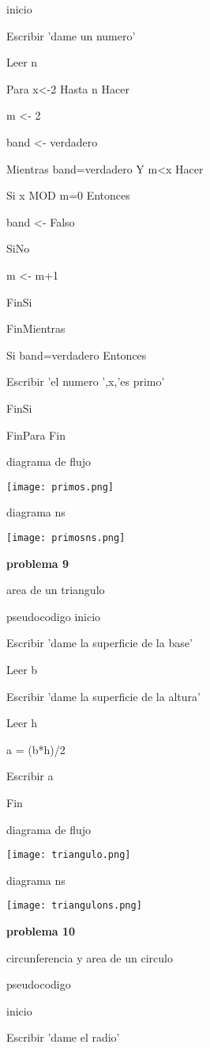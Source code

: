\documentclass[10pt,a4paper]{article}
\begin{document}
\begin{multicols}{2}
inicio

Escribir 'dame un numero'

	Leer n

	Para x<-2 Hasta n Hacer

		m <- 2

		band <- verdadero

		Mientras band=verdadero Y m<x Hacer

			Si x MOD m=0 Entonces

				band <- Falso

			SiNo

				m <- m+1

			FinSi

		FinMientras

		Si band=verdadero Entonces

			Escribir 'el numero ',x,'es primo'

		FinSi
	
	FinPara
Fin
 
 diagrama de flujo
 
\texttt{[image: primos.png]} 

diagrama ns

\texttt{[image: primosns.png]} 
	
\begin{center}
\textbf{problema 9}
\end{center}	
	area de un triangulo 
	
	pseudocodigo 
inicio

Escribir 'dame la superficie de la base'

	Leer b

	Escribir 'dame la superficie de la altura'

	Leer h

	a = (b*h)/2
	
	Escribir a
	
Fin

diagrama de flujo 

\texttt{[image: triangulo.png]}

diagrama ns

\texttt{[image: triangulons.png]}

\begin{center}
\textbf{problema 10}
\end{center}

circunferencia y area de un circulo 

pseudocodigo 

inicio

Escribir 'dame el radio'
	

\end{multicols}
\end{document}
